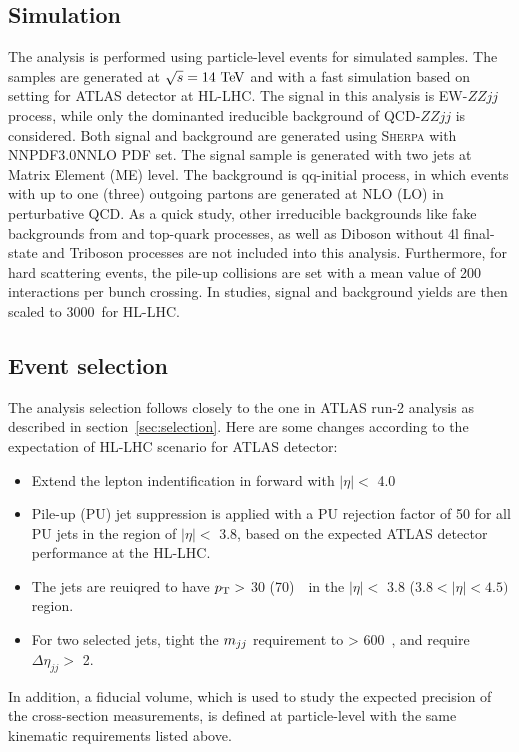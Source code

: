 \subsection{Simulation}

The analysis is performed using particle-level events for simulated samples.
The samples are generated at $\sqrt{s} = 14~\text{Te\kern -0.1em V}$ and with a fast simulation based on setting for ATLAS detector at HL-LHC.
The signal in this analysis is EW-$ZZjj$ process, while only the dominanted ireducible background of QCD-$ZZjj$ is considered.
Both signal and background are generated using \textsc{Sherpa} with NNPDF3.0NNLO PDF set.
The signal sample is generated with two jets at Matrix Element (ME) level.
The background is qq-initial process, in which events with up to one (three) outgoing partons are generated at NLO (LO) in perturbative QCD.
As a quick study, other irreducible backgrounds like fake backgrounds from \Zjet and top-quark processes, as well as Diboson without 4l final-state and Triboson processes are not included into this analysis.
Furthermore, for hard scattering events, the pile-up collisions are set with a mean value of 200 interactions per bunch crossing.
In studies, signal and background yields are then scaled to 3000~\ifb for HL-LHC.

\subsection{Event selection}

The analysis selection follows closely to the one in ATLAS run-2 analysis as described in section~\ref{sec:selection}.
Here are some changes according to the expectation of HL-LHC scenario for ATLAS detector:
\begin{itemize}
	\item Extend the lepton indentification in forward with $|\eta| <$ 4.0
	\item Pile-up (PU) jet suppression is applied with a PU rejection factor of 50 for all PU jets in the region of $|\eta| <$ 3.8, based on the expected ATLAS detector performance at the HL-LHC.
	\item The jets are reuiqred to have $p_{\text{T}} >$ 30 (70)~\gev~in the $|\eta| <$ 3.8 ($3.8 < |\eta| < 4.5)$ region.
	\item For two selected jets, tight the $m_{jj}$ requirement to > 600~\gev, and require $\Delta \eta_{jj} >$ 2.
\end{itemize}
In addition, a fiducial volume, which is used to study the expected precision of the cross-section measurements,
 is defined at particle-level with the same kinematic requirements listed above.

